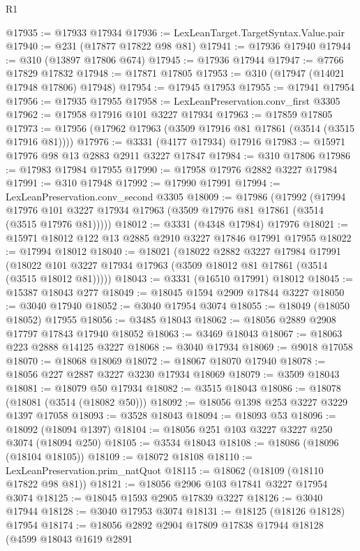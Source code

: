 \begin{lexlean}{R1}
\begin{coremodule}
@17935 := @17933 @17934
@17936 := LexLeanTarget.TargetSyntax.Value.pair
@17940 := @231 (@17877 @17822 @98 @81)
@17941 := @17936 @17940
@17944 := @310 (@13897 @17806 @674)
@17945 := @17936 @17944
@17947 := @7766 @17829 @17832
@17948 := @17871 @17805
@17953 := @310 (@17947 (@14021 @17948 @17806) @17948)
@17954 := @17945 @17953
@17955 := @17941 @17954
@17956 := @17935 @17955
@17958 := LexLeanPreservation.conv_first @3305
@17962 := @17958 @17916 @101 @3227 @17934
@17963 := @17859 @17805
@17973 := @17956 (@17962 @17963 (@3509 @17916 @81 @17861 (@3514 (@3515 @17916 @81))))
@17976 := @3331 (@4177 @17934) @17916
@17983 := @15971 @17976 @98 @13 @2883 @2911 @3227 @17847
@17984 := @310 @17806
@17986 := @17983 @17984 @17955
@17990 := @17958 @17976 @2882 @3227 @17984
@17991 := @310 @17948
@17992 := @17990 @17991
@17994 := LexLeanPreservation.conv_second @3305
@18009 := @17986
    (@17992
      (@17994 @17976 @101 @3227 @17934 @17963 (@3509 @17976 @81 @17861 (@3514 (@3515 @17976 @81)))))
@18012 := @3331 (@4348 @17984) @17976
@18021 := @15971 @18012 @122 @13 @2885 @2910 @3227 @17846 @17991 @17955
@18022 := @17994 @18012
@18040 := @18021
    (@18022
      @2882
      @3227
      @17984
      @17991
      (@18022 @101 @3227 @17934 @17963 (@3509 @18012 @81 @17861 (@3514 (@3515 @18012 @81)))))
@18043 := @3331 (@16510 @17991) @18012
@18045 := @15387 @18043 @277
@18049 := @18045 @1594 @2909 @17844 @3227
@18050 := @3040 @17940
@18052 := @3040 @17954 @3074
@18055 := @18049 (@18050 @18052) @17955
@18056 := @3485 @18043
@18062 := @18056 @2889 @2908 @17797 @17843 @17940 @18052
@18063 := @3469 @18043
@18067 := @18063 @223 @2888 @14125 @3227
@18068 := @3040 @17934
@18069 := @9018 @17058
@18070 := @18068 @18069
@18072 := @18067 @18070 @17940
@18078 := @18056 @227 @2887 @3227 @3230 @17934 @18069
@18079 := @3509 @18043
@18081 := @18079 @50 @17934
@18082 := @3515 @18043
@18086 := @18078 (@18081 (@3514 (@18082 @50)))
@18092 := @18056 @1398 @253 @3227 @3229 @1397 @17058
@18093 := @3528 @18043
@18094 := @18093 @53
@18096 := @18092 (@18094 @1397)
@18104 := @18056 @251 @103 @3227 @3227 @250 @3074 (@18094 @250)
@18105 := @3534 @18043
@18108 := @18086 (@18096 (@18104 @18105))
@18109 := @18072 @18108
@18110 := LexLeanPreservation.prim_natQuot
@18115 := @18062 (@18109 (@18110 @17822 @98 @81))
@18121 := @18056 @2906 @103 @17841 @3227 @17954 @3074
@18125 := @18045 @1593 @2905 @17839 @3227
@18126 := @3040 @17944
@18128 := @3040 @17953 @3074
@18131 := @18125 (@18126 @18128) @17954
@18174 := @18056
    @2892
    @2904
    @17809
    @17838
    @17944
    @18128
    (@4599
      @18043
      @1619
      @2891

\end{coremodule}
\end{lexlean}
